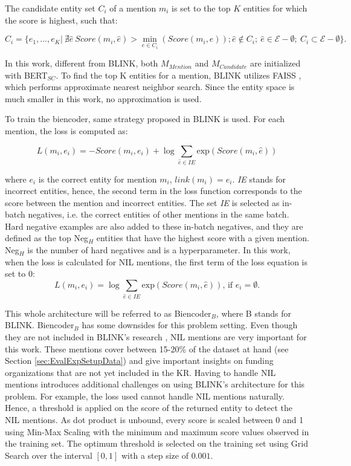 \documentclass{report}
\theoremstyle{definition}
\theoremstyle{remark}
\begin{document}
The candidate entity set $C_i$ of a mention $m_i$ is set to the top $K$ entities for which the score is highest, such that:

\begin{equation}
    C_i = \{e_1,...,e_K | \ \nexists\hat{e} \ Score(m_i,\hat{e}) > \min_{e\in C_i}(Score(m_i, e )); \hat{e} \notin C_i; \ \hat{e} \in \mathcal{E}-\emptyset; \ C_i \subset \mathcal{E}-\emptyset  \}.
\end{equation}

In this work, different from BLINK, both $M_{Mention}$ and $M_{Candidate}$ are initialized with BERT$_{SC}$. To find the top K entities for a mention, BLINK utilizes FAISS \cite{faiss}, which performs approximate nearest neighbor search. Since the entity space is much smaller in this work, no approximation is used. 

To train the biencoder, same strategy proposed in BLINK is used. For each mention, the loss is computed as:

\begin{equation}
    L(m_i,e_i) = -Score(m_i,e_i) + \log \sum_{\hat{e} \in IE} \text{exp}( Score(m_i,\hat{e}))
\end{equation}

\noindent where $e_i$ is the correct entity for mention $m_i$, $link(m_i)=e_i$. \textit{IE} stands for incorrect entities, hence, the second term in the loss function corresponds to the score between the mention and incorrect entities. The set \textit{IE} is selected as in-batch negatives, i.e. the correct entities of other mentions in the same batch. Hard negative examples are also added to these in-batch negatives, and they are defined as the top Neg$_H$ entities that have the highest score with a given mention. Neg$_H$ is the number of hard negatives and is a hyperparameter. In this work, when the loss is calculated for NIL mentions, the first term of the loss equation is set to 0:
\begin{equation}
    L(m_i,e_i) = \log \sum_{\hat{e} \in IE} \text{exp}( Score(m_i,\hat{e})) \text{, if } e_i = \emptyset.
\end{equation}

This whole architecture will be referred to as Biencoder$_{B}$, where B stands for BLINK. Biencoder$_{B}$ has some downsides for this problem setting. Even though they are not included in BLINK's research \cite{scalablezeroshot}, NIL mentions are very important for this work. These mentions cover between 15-20\% of the dataset at hand (see Section \ref{sec:EvalExpSetupData}) and give important insights on funding organizations that are not yet included in the KR. Having to handle NIL mentions introduces additional challenges on using BLINK's architecture for this problem. For example, the loss used cannot handle NIL mentions naturally. Hence, a threshold is applied on the score of the returned entity to detect the NIL mentions. As dot product is unbound, every score is scaled between 0 and 1 using Min-Max Scaling with the minimum and maximum score values observed in the training set. The optimum threshold is selected on the training set using Grid Search over the interval $[0,1]$ with a step size of $0.001$.
\end{document}
